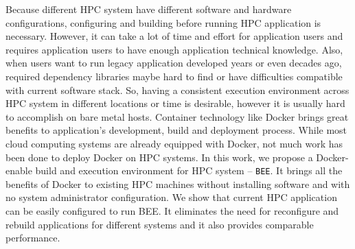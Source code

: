Because different HPC system have different software and hardware configurations, configuring and building before running HPC application is necessary. However, it can take a lot of time and effort for application users and requires application users to have enough application technical knowledge.   Also, when users want to run legacy application developed years or even decades ago, required dependency libraries maybe hard to find or have difficulties compatible with current software stack. So, having a consistent execution environment across HPC system in different locations or time is desirable, however it is usually hard to accomplish on bare metal hosts. Container technology like Docker brings great benefits to application's development, build and deployment process. While most cloud computing systems are already equipped with Docker, not much work has been done to deploy Docker on HPC systems. In this work, we propose a Docker-enable build and execution environment for HPC system -- \texttt{BEE}. It brings all the benefits of Docker to existing HPC machines without installing software and with no system administrator configuration. We show that current HPC application can be easily configured to run BEE. It eliminates the need for reconfigure and rebuild applications for different systems and it also provides comparable performance. 

